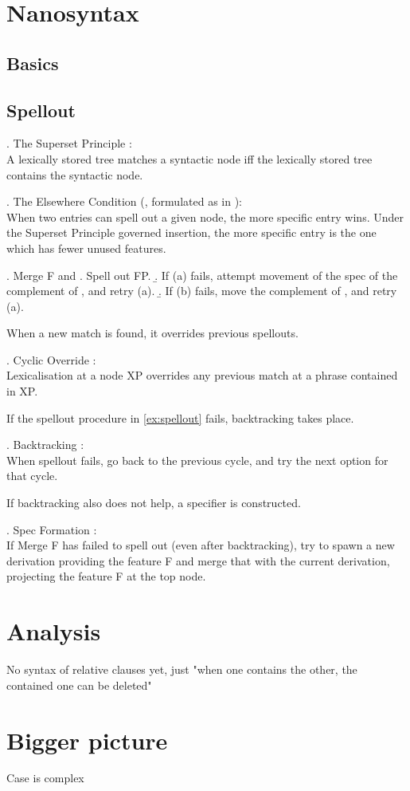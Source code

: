 \section{Nanosyntax}

\subsection{Basics}

\subsection{Spellout}

\ex. The Superset Principle \citet{starke2009}: \\
A lexically stored tree matches a syntactic node iff the lexically stored tree contains the syntactic node.

\ex. The Elsewhere Condition (\citealt{kiparsky1973}, formulated as in \citealt{caha2020}):\\
When two entries can spell out a given node, the more specific entry wins. Under the Superset Principle governed insertion, the more specific entry is the one which has fewer unused features.

\ex. Merge F and \label{ex:spellout}
 \a. Spell out FP.
 \b. If (a) fails, attempt movement of the spec of the complement of , and retry (a).
 \b. If (b) fails, move the complement of , and retry (a).

When a new match is found, it overrides previous spellouts.

\ex. Cyclic Override \citep{starke2018}:\\
Lexicalisation at a node XP overrides any previous match at a phrase contained in XP.

If the spellout procedure in \ref{ex:spellout} fails, backtracking takes place.

\ex. Backtracking \citep{starke2018}:\\
When spellout fails, go back to the previous cycle, and try the next option for that cycle.\label{ex:backtracking}

If backtracking also does not help, a specifier is constructed.

\ex. Spec Formation \citep{starke2018}:\\
If Merge F has failed to spell out (even after backtracking), try to spawn a new derivation providing the feature F and merge that with the current derivation, projecting the feature F at the top node.\label{ex:specformation}



\section{Analysis}

No syntax of relative clauses yet, just "when one contains the other, the contained one can be deleted"




\section{Bigger picture}

Case is complex
